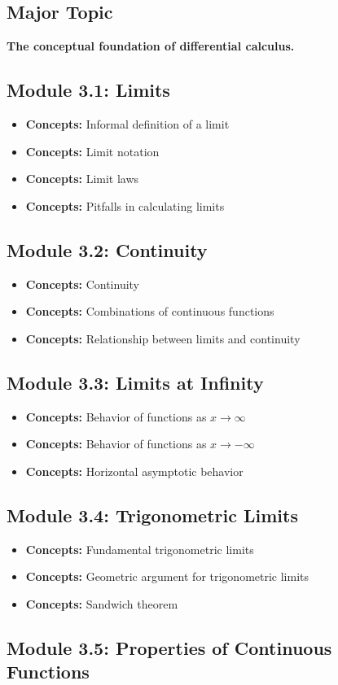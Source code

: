 \documentclass[11pt]{article}
\newcommand{\concept}[1]{\item \textbf{Concepts:} #1}
\begin{document}
\subsection{Major Topic}

\textbf{The conceptual foundation of differential calculus.}

\subsection{Module 3.1: Limits}

\begin{itemize}
    \concept{Informal definition of a limit}
    \concept{Limit notation}
    \concept{Limit laws}
    \concept{Pitfalls in calculating limits}
\end{itemize}

\subsection{Module 3.2: Continuity}

\begin{itemize}
    \concept{Continuity}
    \concept{Combinations of continuous functions}
    \concept{Relationship between limits and continuity}
\end{itemize}

\subsection{Module 3.3: Limits at Infinity}

\begin{itemize}
    \concept{Behavior of functions as $x\to\infty$}
    \concept{Behavior of functions as $x\to-\infty$}
    \concept{Horizontal asymptotic behavior}
\end{itemize}

\subsection{Module 3.4: Trigonometric Limits}

\begin{itemize}
    \concept{Fundamental trigonometric limits}
    \concept{Geometric argument for trigonometric limits}
    \concept{Sandwich theorem}
\end{itemize}

\subsection{Module 3.5: Properties of Continuous Functions}
\end{document}
